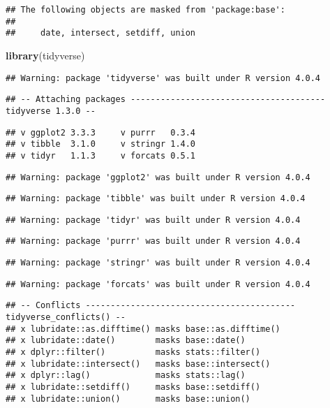 \documentclass[
]{article}
\newenvironment{Shaded}{\begin{snugshade}}{\end{snugshade}}
\newcommand{\KeywordTok}[1]{\textcolor[rgb]{0.13,0.29,0.53}{\textbf{#1}}}
\newcommand{\NormalTok}[1]{#1}
\begin{document}
\begin{verbatim}
## The following objects are masked from 'package:base':
## 
##     date, intersect, setdiff, union
\end{verbatim}

\begin{Shaded}
\begin{Highlighting}[]
\KeywordTok{library}\NormalTok{(tidyverse)}
\end{Highlighting}
\end{Shaded}

\begin{verbatim}
## Warning: package 'tidyverse' was built under R version 4.0.4
\end{verbatim}

\begin{verbatim}
## -- Attaching packages --------------------------------------- tidyverse 1.3.0 --
\end{verbatim}

\begin{verbatim}
## v ggplot2 3.3.3     v purrr   0.3.4
## v tibble  3.1.0     v stringr 1.4.0
## v tidyr   1.1.3     v forcats 0.5.1
\end{verbatim}

\begin{verbatim}
## Warning: package 'ggplot2' was built under R version 4.0.4
\end{verbatim}

\begin{verbatim}
## Warning: package 'tibble' was built under R version 4.0.4
\end{verbatim}

\begin{verbatim}
## Warning: package 'tidyr' was built under R version 4.0.4
\end{verbatim}

\begin{verbatim}
## Warning: package 'purrr' was built under R version 4.0.4
\end{verbatim}

\begin{verbatim}
## Warning: package 'stringr' was built under R version 4.0.4
\end{verbatim}

\begin{verbatim}
## Warning: package 'forcats' was built under R version 4.0.4
\end{verbatim}

\begin{verbatim}
## -- Conflicts ------------------------------------------ tidyverse_conflicts() --
## x lubridate::as.difftime() masks base::as.difftime()
## x lubridate::date()        masks base::date()
## x dplyr::filter()          masks stats::filter()
## x lubridate::intersect()   masks base::intersect()
## x dplyr::lag()             masks stats::lag()
## x lubridate::setdiff()     masks base::setdiff()
## x lubridate::union()       masks base::union()
\end{verbatim}
\end{document}
